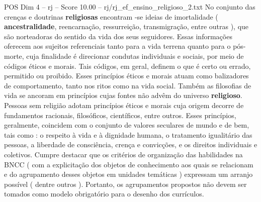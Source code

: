 \begin{textsample}{POS Dim 4 – rj – Score 10.00 – rj/rj\_ef\_ensino\_religioso\_2.txt}
No conjunto das crenças e doutrinas \textbf{religiosas} encontram -se ideias de imortalidade ( \textbf{ancestralidade}, reencarnação, ressurreição, transmigração, entre outras ), que são norteadoras do sentido da vida dos seus seguidores.
Essas informações oferecem aos sujeitos referenciais tanto para a vida terrena quanto para o pós-morte, cuja finalidade é direcionar condutas individuais e sociais, por meio de códigos éticos e morais.
Tais códigos, em geral, definem o que é certo ou errado, permitido ou proibido.
Esses princípios éticos e morais atuam como balizadores de comportamento, tanto nos ritos como na vida social.
Também as filosofias de vida se ancoram em princípios cujas fontes não advêm do universo \textbf{religioso}.
Pessoas sem religião adotam princípios éticos e morais cuja origem decorre de fundamentos racionais, filosóficos, científicos, entre outros.
Esses princípios, geralmente, coincidem com o conjunto de valores seculares de mundo e de bem, tais como : o respeito à vida e à dignidade humana, o tratamento igualitário das pessoas, a liberdade de consciência, crença e convicções, e os direitos individuais e coletivos.
Cumpre destacar que os critérios de organização das habilidades na BNCC ( com a explicitação dos objetos de conhecimento aos quais se relacionam e do agrupamento desses objetos em unidades temáticas ) expressam um arranjo possível ( dentre outros ).
Portanto, os agrupamentos propostos não devem ser tomados como modelo obrigatório para o desenho dos currículos.

\end{textsample}
